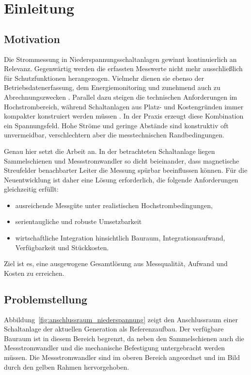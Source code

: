 \section{Einleitung}
\label{chap:einleitung}

\subsection{Motivation}
\label{sec:motivation}

Die Strommessung in Niederspannungsschaltanlagen gewinnt kontinuierlich an Relevanz. Gegenwärtig werden die erfassten Messwerte nicht mehr ausschließlich für Schutzfunktionen herangezogen. Vielmehr dienen sie ebenso der Betriebsdatenerfassung, dem Energiemonitoring und zunehmend auch zu Abrechnungszwecken \cite{pdf-Zellularer_Ansatz-VDE, norm-DIN_ISO_50001-Energiemanagement-DIN}. Parallel dazu steigen die technischen Anforderungen im Hochstrombereich, während Schaltanlagen aus Platz- und Kostengründen immer kompakter konstruiert werden müssen \cite[Kap.~1.4]{pdf-Planung_Energieverteilung-Siemens}. In der Praxis erzeugt diese Kombination ein Spannungsfeld. Hohe Ströme und geringe Abstände sind konstruktiv oft unvermeidbar, verschlechtern aber die messtechnischen Randbedingungen.

Genau hier setzt die Arbeit an. In der betrachteten Schaltanlage liegen Sammelschienen und Messstromwandler so dicht beieinander, dass magnetische Streufelder benachbarter Leiter die Messung spürbar beeinflussen können. Für die Neuentwicklung ist daher eine Lösung erforderlich, die folgende Anforderungen gleichzeitig erfüllt:
\begin{itemize}
    \item ausreichende Messgüte unter realistischen Hochstrombedingungen,
    \item serientaugliche und robuste Umsetzbarkeit
    \item wirtschaftliche Integration hinsichtlich Bauraum, Integrationsaufwand, Verfügbarkeit und Stückkosten.
\end{itemize}
Ziel ist es, eine ausgewogene Gesamtlösung aus Messqualität, Aufwand und Kosten zu erreichen.

\subsection{Problemstellung}
\label{sec:problemstellung}

Abbildung~\ref{fig:anschlussraum_niederspannung} zeigt den Anschlussraum einer Schaltanlage der aktuellen Generation als Referenzaufbau. Der verfügbare Bauraum ist in diesem Bereich begrenzt, da neben den Sammelschienen auch die Messstromwandler und die mechanische Befestigung untergebracht werden müssen. Die Messstromwandler sind im oberen Bereich angeordnet und im Bild durch den gelben Rahmen hervorgehoben.

